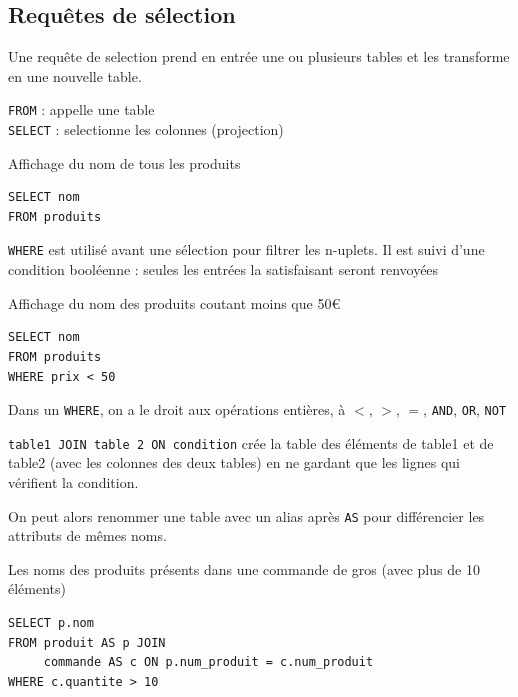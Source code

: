 \subsection{Requêtes de sélection}

Une requête de selection prend en entrée une ou plusieurs tables et les transforme en une nouvelle table.

\begin{syntaxe}
	\texttt{FROM} : appelle une table\\
	\texttt{SELECT} : selectionne les colonnes (projection)
\end{syntaxe}

\begin{example}
	Affichage du nom de tous les produits
	\begin{lstlisting}
SELECT nom
FROM produits
	\end{lstlisting}
\end{example}

\begin{syntaxe}
	\texttt{WHERE} est utilisé avant une sélection pour filtrer les n-uplets. Il est suivi d'une condition booléenne : seules les entrées la satisfaisant seront renvoyées
\end{syntaxe}

\begin{example}
	Affichage du nom des produits coutant moins que 50€
	\begin{lstlisting}
SELECT nom
FROM produits
WHERE prix < 50
	\end{lstlisting}
\end{example}

\begin{rem}
	Dans un \texttt{WHERE}, on a le droit aux opérations entières, à $<$, $>$, $=$, \texttt{AND}, \texttt{OR}, \texttt{NOT}
\end{rem}

\begin{syntaxe}
	\texttt{table1 \texttt{JOIN} table 2 \texttt{ON} condition} crée la table des éléments de table1 et de table2 (avec les colonnes des deux tables) en ne gardant que les lignes qui vérifient la condition.
	
	On peut alors renommer une table avec un alias après \texttt{AS} pour différencier les attributs de mêmes noms.
\end{syntaxe}

\begin{example}
	Les noms des produits présents dans une commande de gros (avec plus de 10 éléments)
	\begin{lstlisting}
SELECT p.nom
FROM produit AS p JOIN
     commande AS c ON p.num_produit = c.num_produit
WHERE c.quantite > 10
	\end{lstlisting}
\end{example}


